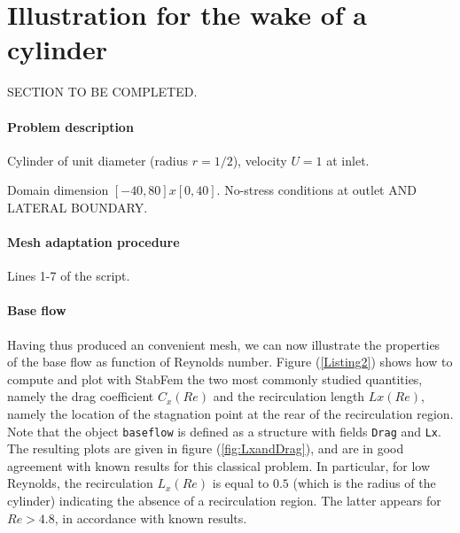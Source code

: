 \documentclass[twocolumn,10pt]{asme2ej}
\begin{document}
\section{Illustration for the wake of a cylinder} 
\vspace{.2cm}

SECTION TO BE COMPLETED.

\paragraph{Problem description}

Cylinder of unit diameter (radius $r=1/2$), velocity $U = 1$ at inlet.

Domain dimension $[-40,80]x[0,40]$. No-stress conditions at outlet AND LATERAL BOUNDARY.

\paragraph{Mesh adaptation procedure}

Lines 1-7 of the script.

\paragraph{Base flow}

Having thus produced an convenient mesh, we can now illustrate the properties of the base flow as function of Reynolds number. Figure (\ref{Listing2}) shows how to compute and plot with StabFem the two most commonly studied quantities, namely the drag coefficient $C_x(Re)$  and the recirculation length $Lx(Re)$, namely the location of the stagnation point at the rear of the recirculation region. 
Note that the object \verb|baseflow| is defined as a structure with fields \verb|Drag| and \verb|Lx|. 
The resulting plots are given in figure (\ref{fig:LxandDrag}), and are in good agreement with known results for this classical problem.
In particular, for low Reynolds, the recirculation $L_x(Re)$ is equal to $0.5$ (which is the radius of the cylinder) indicating the absence of a recirculation region. The latter appears for $Re > 4.8$, in accordance with known results.





\end{document}
